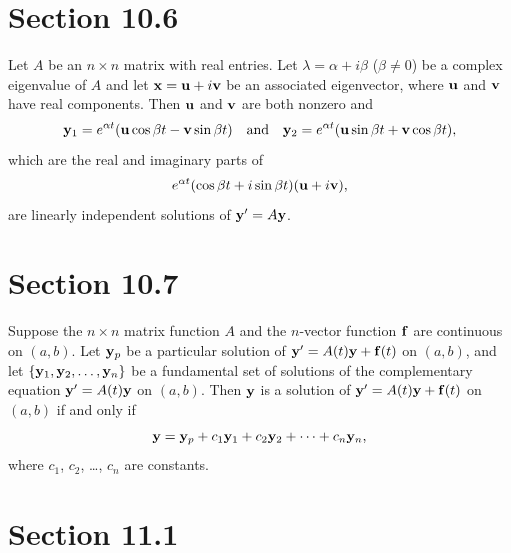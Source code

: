 \section*{Section 10.6}
\setcounter{chapter}{10}
\setcounter{section}{6}

\setcounter{theorem}{0}
\setcounter{equation}{2}
\begin{theorem}
  \label{thmtype:10.6.1} Let $A$ be an $n\times n$ matrix with real entries. Let
  $\lambda=\alpha+i\beta$ {\rm(}$\beta\ne0${\rm}) be a complex eigenvalue of $A$ and let
  ${\bf x}={\bf u}+i{\bf v}$ be an associated eigenvector, where ${\bf u}$ and ${\bf v}$ have real
  components. Then ${\bf u}$ and ${\bf v}$ are both nonzero and
  \[
    {\bf y}_{1}=e^{\alpha t}({\bf u}\cos\beta t-{\bf v}\sin\beta t) \mbox{\quad and\quad}{\bf y}_{2}=e^{\alpha t}({\bf u}\sin\beta t+{\bf v}\cos\beta t),
  \]
  which are the real and imaginary parts of
  \begin{equation}
    \label{eq:10.6.3}e^{\alpha t}(\cos\beta t+i\sin\beta t)({\bf u}+i{\bf v}),
  \end{equation}
  are linearly independent solutions of ${\bf y}'=A{\bf y}$.
\end{theorem}

\section*{Section 10.7}
\setcounter{chapter}{10}
\setcounter{section}{7}

\setcounter{theorem}{0}
\begin{theorem}
  \label{thmtype:10.7.1} Suppose the $n\times n$ matrix function $A$ and the $n$-vector function
  ${\bf f}$ are continuous on $(a,b)$. Let ${\bf y}_{p}$ be a particular solution of
  ${\bf y}'=A(t){\bf y}+{\bf f}(t)$ on $(a,b)$, and let
  $\{{\bf y}_{1},{\bf y}_{2},\dots,{\bf y}_{n}\}$ be a fundamental set of solutions of the
  complementary equation ${\bf y}'=A(t){\bf y}$ on $(a,b)$. Then ${\bf y}$ is a solution of
  ${\bf y}'=A(t){\bf y}+{\bf f}(t)$ on $(a,b)$ if and only if
  \[
    {\bf y}={\bf y}_{p}+c_{1}{\bf y}_{1}+c_{2}{\bf y}_{2}+\cdots+c_{n}{\bf y}_{n},
  \]
  where $c_{1}$, $c_{2}$, \dots, $c_{n}$ are constants.
\end{theorem}

\section*{Section 11.1}
{}
\setcounter{chapter}{11}
\setcounter{section}{1}

